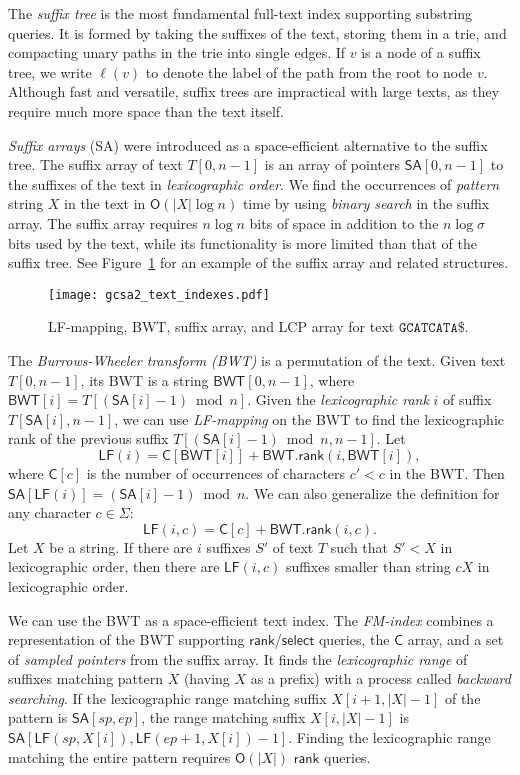 \documentclass[a4paper,11pt]{llncs}
\newcommand{\abs}[1]{\ensuremath{\lvert #1 \rvert}}
\newcommand{\Oh}[1]{\ensuremath{\mathsf{O}\!\left( #1 \right)}}
\newcommand{\rank}{\ensuremath{\mathsf{rank}}}
\newcommand{\select}{\ensuremath{\mathsf{select}}}
\newcommand{\LF}{\ensuremath{\mathsf{LF}}}
\newcommand{\LFmapping}{LF\nobreakdash-mapping}
\newcommand{\FMindex}{FM\nobreakdash-index}
\newcommand{\SA}{\ensuremath{\mathsf{SA}}}
\newcommand{\BWT}{\ensuremath{\mathsf{BWT}}}
\newcommand{\Carray}{\ensuremath{\mathsf{C}}}
\begin{document}
The \emph{suffix tree} \cite{Weiner1973} is the most fundamental full-text index supporting substring queries. It is formed by taking the suffixes of the text, storing them in a trie, and compacting unary paths in the trie into single edges. If $v$ is a node of a suffix tree, we write $\ell(v)$ to denote the label of the path from the root to node $v$. Although fast and versatile, suffix trees are impractical with large texts, as they require much more space than the text itself.

\emph{Suffix arrays} (SA) \cite{Manber1993} were introduced as a space-efficient alternative to the suffix tree. The suffix array of text $T[0, n-1]$ is an array of pointers $\SA[0, n-1]$ to the suffixes of the text in \emph{lexicographic order}. We find the occurrences of \emph{pattern} string $X$ in the text in $\Oh{\abs{X} \log n}$ time by using \emph{binary search} in the suffix array. The suffix array requires $n \log n$ bits of space in addition to the $n \log \sigma$ bits used by the text, while its functionality is more limited than that of the suffix tree. See Figure~\ref{figure:indexes} for an example of the suffix array and related structures.

\begin{figure}[t!]
\centering
\texttt{[image: gcsa2\_text\_indexes.pdf]}
\caption{\protect\LFmapping, BWT, suffix array, and LCP array for text $\mathtt{GCATCATA}\$$.}\label{figure:indexes}
\end{figure}

The \emph{Burrows-Wheeler transform (BWT)} \cite{Burrows1994} is a permutation of the text. Given text $T[0, n-1]$, its BWT is a string $\BWT[0, n-1]$, where $\BWT[i] = T[(\SA[i]-1) \bmod n]$. Given the \emph{lexicographic rank} $i$ of suffix $T[\SA[i], n-1]$, we can use \emph{\LFmapping} on the BWT to find the lexicographic rank of the previous suffix $T[(\SA[i]-1) \bmod n, n-1]$. Let
$$
\LF(i) = \Carray[\BWT[i]] + \BWT.\rank(i, \BWT[i]),
$$
where $\Carray[c]$ is the number of occurrences of characters $c' < c$ in the BWT. Then $\SA[\LF(i)] = (\SA[i]-1) \bmod n$. We can also generalize the definition for any character $c \in \Sigma$:
$$
\LF(i, c) = \Carray[c] + \BWT.\rank(i, c).
$$
Let $X$ be a string. If there are $i$ suffixes $S'$ of text $T$ such that $S' < X$ in lexicographic order, then there are $\LF(i, c)$ suffixes smaller than string $cX$ in lexicographic order.

We can use the BWT as a space-efficient text index. The \emph{\FMindex} \cite{Ferragina2005a} combines a representation of the BWT supporting $\rank$/$\select$ queries, the $\Carray$ array, and a set of \emph{sampled pointers} from the suffix array. It finds the \emph{lexicographic range} of suffixes matching pattern $X$ (having $X$ as a prefix) with a process called \emph{backward searching}. If the lexicographic range matching suffix $X[i+1, \abs{X}-1]$ of the pattern is $\SA[sp, ep]$, the range matching suffix $X[i, \abs{X}-1]$ is $\SA[\LF(sp, X[i]), \LF(ep+1, X[i]) - 1]$. Finding the lexicographic range matching the entire pattern requires $\Oh{\abs{X}}$ $\rank$ queries.
\end{document}
